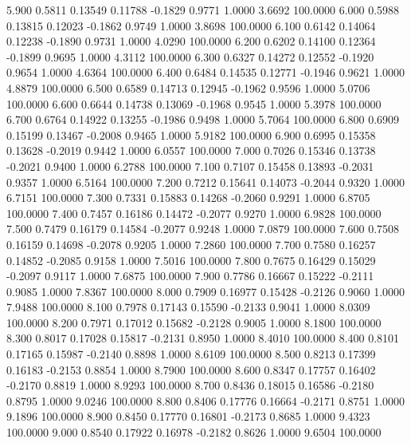    5.900   0.5811   0.13549   0.11788  -0.1829   0.9771   1.0000   3.6692 100.0000
   6.000   0.5988   0.13815   0.12023  -0.1862   0.9749   1.0000   3.8698 100.0000
   6.100   0.6142   0.14064   0.12238  -0.1890   0.9731   1.0000   4.0290 100.0000
   6.200   0.6202   0.14100   0.12364  -0.1899   0.9695   1.0000   4.3112 100.0000
   6.300   0.6327   0.14272   0.12552  -0.1920   0.9654   1.0000   4.6364 100.0000
   6.400   0.6484   0.14535   0.12771  -0.1946   0.9621   1.0000   4.8879 100.0000
   6.500   0.6589   0.14713   0.12945  -0.1962   0.9596   1.0000   5.0706 100.0000
   6.600   0.6644   0.14738   0.13069  -0.1968   0.9545   1.0000   5.3978 100.0000
   6.700   0.6764   0.14922   0.13255  -0.1986   0.9498   1.0000   5.7064 100.0000
   6.800   0.6909   0.15199   0.13467  -0.2008   0.9465   1.0000   5.9182 100.0000
   6.900   0.6995   0.15358   0.13628  -0.2019   0.9442   1.0000   6.0557 100.0000
   7.000   0.7026   0.15346   0.13738  -0.2021   0.9400   1.0000   6.2788 100.0000
   7.100   0.7107   0.15458   0.13893  -0.2031   0.9357   1.0000   6.5164 100.0000
   7.200   0.7212   0.15641   0.14073  -0.2044   0.9320   1.0000   6.7151 100.0000
   7.300   0.7331   0.15883   0.14268  -0.2060   0.9291   1.0000   6.8705 100.0000
   7.400   0.7457   0.16186   0.14472  -0.2077   0.9270   1.0000   6.9828 100.0000
   7.500   0.7479   0.16179   0.14584  -0.2077   0.9248   1.0000   7.0879 100.0000
   7.600   0.7508   0.16159   0.14698  -0.2078   0.9205   1.0000   7.2860 100.0000
   7.700   0.7580   0.16257   0.14852  -0.2085   0.9158   1.0000   7.5016 100.0000
   7.800   0.7675   0.16429   0.15029  -0.2097   0.9117   1.0000   7.6875 100.0000
   7.900   0.7786   0.16667   0.15222  -0.2111   0.9085   1.0000   7.8367 100.0000
   8.000   0.7909   0.16977   0.15428  -0.2126   0.9060   1.0000   7.9488 100.0000
   8.100   0.7978   0.17143   0.15590  -0.2133   0.9041   1.0000   8.0309 100.0000
   8.200   0.7971   0.17012   0.15682  -0.2128   0.9005   1.0000   8.1800 100.0000
   8.300   0.8017   0.17028   0.15817  -0.2131   0.8950   1.0000   8.4010 100.0000
   8.400   0.8101   0.17165   0.15987  -0.2140   0.8898   1.0000   8.6109 100.0000
   8.500   0.8213   0.17399   0.16183  -0.2153   0.8854   1.0000   8.7900 100.0000
   8.600   0.8347   0.17757   0.16402  -0.2170   0.8819   1.0000   8.9293 100.0000
   8.700   0.8436   0.18015   0.16586  -0.2180   0.8795   1.0000   9.0246 100.0000
   8.800   0.8406   0.17776   0.16664  -0.2171   0.8751   1.0000   9.1896 100.0000
   8.900   0.8450   0.17770   0.16801  -0.2173   0.8685   1.0000   9.4323 100.0000
   9.000   0.8540   0.17922   0.16978  -0.2182   0.8626   1.0000   9.6504 100.0000
